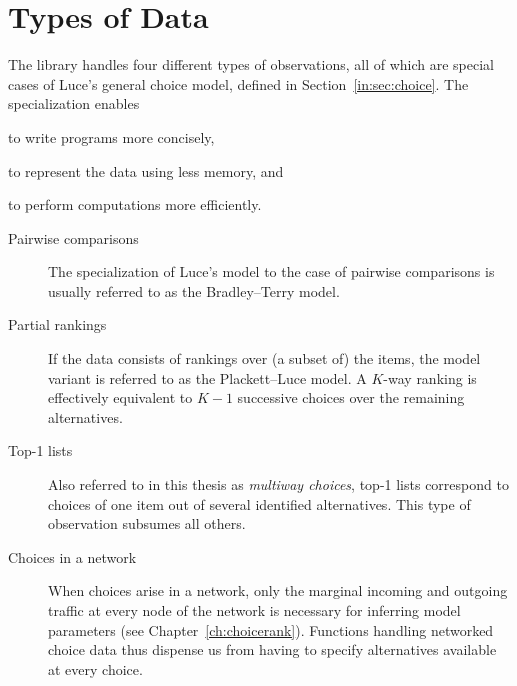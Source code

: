 \section{Types of Data}

The library handles four different types of observations, all of which are special cases of Luce's general choice model, defined in Section~\ref{in:sec:choice}.
The specialization enables
\begin{enuminline}
\item to write programs more concisely,
\item to represent the data using less memory, and
\item to perform computations more efficiently.
\end{enuminline}

\begin{description}
\item[Pairwise comparisons] The specialization of Luce's model to the case of pairwise comparisons is usually referred to as the Bradley--Terry model.

\item[Partial rankings] If the data consists of rankings over (a subset of) the items, the model variant is referred to as the Plackett--Luce model.
A $K$-way ranking is effectively equivalent to $K-1$ successive choices over the remaining alternatives.

\item[Top-1 lists] Also referred to in this thesis as \emph{multiway choices}, top-1 lists correspond to choices of one item out of several identified alternatives.
This type of observation subsumes all others.

\item[Choices in a network] When choices arise in a network, only the marginal incoming and outgoing traffic at every node of the network is necessary for inferring model parameters (see Chapter~\ref{ch:choicerank}).
Functions handling networked choice data thus dispense us from having to specify alternatives available at every choice.
\end{description}
